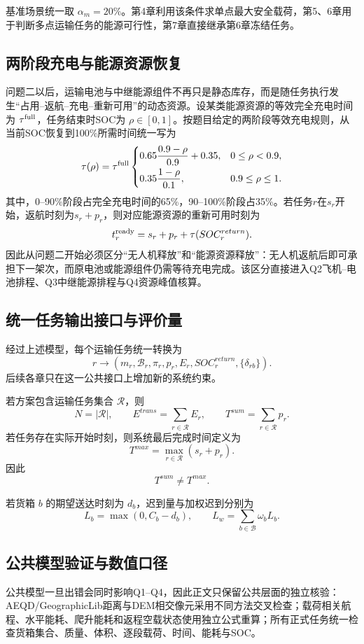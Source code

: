 \documentclass[UTF8,a4paper,12pt]{ctexart}
\begin{document}
基准场景统一取 $\alpha_m=20\%$。第4章利用该条件求单点最大安全载荷，第5、6章用于判断多点运输任务的能源可行性，第7章直接继承第6章冻结任务。

\subsection{两阶段充电与能源资源恢复}

问题二以后，运输电池与中继能源组件不再只是静态库存，而是随任务执行发生“占用--返航--充电--重新可用”的动态资源。设某类能源资源的等效完全充电时间为 $\tau^{\rm full}$，任务结束时SOC为 $\rho\in[0,1]$。按题目给定的两阶段等效充电规则，从当前SOC恢复到100\%所需时间统一写为
\[
\tau(\rho)=\tau^{\rm full}
\begin{cases}
0.65\dfrac{0.9-\rho}{0.9}+0.35, & 0\le \rho<0.9,\\[6pt]
0.35\dfrac{1-\rho}{0.1}, & 0.9\le \rho\le 1.
\end{cases}
\]
其中，0--90\%阶段占完全充电时间的65\%，90--100\%阶段占35\%。若任务$r$在$s_r$开始，返航时刻为$s_r+p_r$，则对应能源资源的重新可用时刻为
\[
t_r^{\rm ready}=s_r+p_r+\tau(SOC_r^{return}).
\]
因此从问题二开始必须区分“无人机释放”和“能源资源释放”：无人机返航后即可承担下一架次，而原电池或能源组件仍需等待充电完成。该区分直接进入Q2飞机--电池排程、Q3中继能源排程与Q4资源峰值核算。

\subsection{统一任务输出接口与评价量}

经过上述模型，每个运输任务统一转换为
\[
r
\longrightarrow
\left(
m_r,\mathcal B_r,\pi_r,p_r,E_r,SOC_r^{return},\{\delta_{rb}\}
\right).
\]
后续各章只在这一公共接口上增加新的系统约束。

若方案包含运输任务集合 $\mathcal R$，则
\[
N=|\mathcal R|,
\qquad
E^{trans}=\sum_{r\in\mathcal R}E_r,
\qquad
T^{sum}=\sum_{r\in\mathcal R}p_r.
\]
若任务存在实际开始时刻，则系统最后完成时间定义为
\[
T^{max}
=
\max_{r\in\mathcal R}(s_r+p_r).
\]
因此
\[
\boxed{T^{sum}\neq T^{max}}.
\]

若货箱 $b$ 的期望送达时刻为 $d_b$，迟到量与加权迟到分别为
\[
L_b=\max(0,C_b-d_b),
\qquad
L_w=\sum_{b\in\mathcal B}\omega_bL_b.
\]

\subsection{公共模型验证与数值口径}

公共模型一旦出错会同时影响Q1--Q4，因此正文只保留公共层面的独立核验：AEQD/GeographicLib距离与DEM相交像元采用不同方法交叉检查；载荷相关航程、水平能耗、爬升能耗和返程空载状态使用独立公式重算；所有正式任务统一检查货箱集合、质量、体积、逐段载荷、时间、能耗与SOC。
\end{document}
